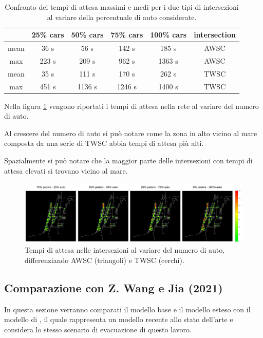 \begin{table}[ht]
    \centering
    \begin{tabular}{|c|c|c|c|c|c|}
        \hline
             & 25\% cars & 50\% cars & 75\% cars & 100\% cars & intersection \\ \hline
        mean & 36 s      & 56 s      & 142 s     & 185 s      & AWSC         \\ \hline
        max  & 223 s     & 209 s     & 962 s     & 1363 s     & AWSC         \\ \hline
        mean & 35 s      & 111 s     & 170 s     & 262 s      & TWSC         \\ \hline
        max  & 451 s     & 1136 s    & 1246 s    & 1400 s     & TWSC         \\ \hline
    \end{tabular}
    \caption{Confronto dei tempi di attesa massimi e medi per i due tipi di intersezioni al variare della percentuale di auto considerate.}
    \label{tab:analisi-car-delay}
\end{table}

Nella figura \ref{fig:analisi-comparison-car-delay} vengono riportati i tempi di attesa nella rete al variare del numero di auto.

Al crescere del numero di auto si può notare come la zona in alto vicino al mare composta da una serie di TWSC abbia tempi di attesa più
alti.

Spazialmente si può notare che la maggior parte delle intersezioni con tempi di attesa elevati si trovano vicino al mare.

\begin{figure}[ht]
    \includegraphics[width=1\textwidth]{images/analisi/comparison-car-delay.png}
    \caption{Tempi di attesa nelle intersezioni al variare del numero di auto, differenziando AWSC (triangoli) e TWSC (cerchi).}
    \label{fig:analisi-comparison-car-delay}
\end{figure}


\subsection{Comparazione con Z. Wang e Jia (2021)}
In questa sezione verranno comparati il modello base e il modello esteso con il modello di \textcite{wang2021novel}, 
il quale rappresenta un modello recente allo stato dell'arte e considera lo stesso scenario di evacuazione di questo lavoro.

